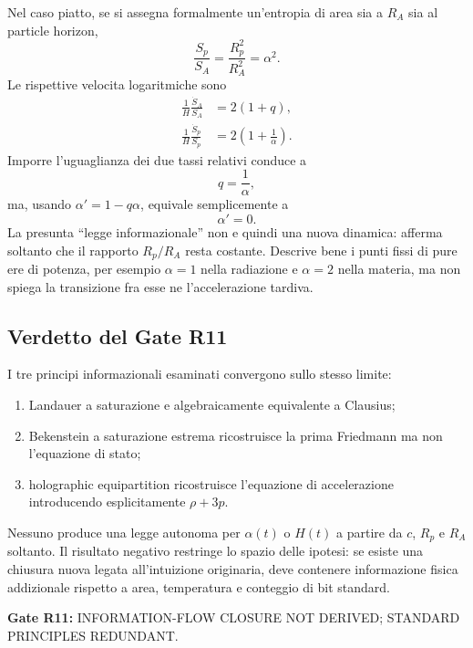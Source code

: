 \documentclass[11pt,a4paper]{article}
\newcommand{\status}[1]{\textsf{#1}}
\begin{document}
Nel caso piatto, se si assegna formalmente un'entropia di area sia a $R_A$ sia al particle horizon,
\begin{equation}
 \frac{S_p}{S_A}=\frac{R_p^2}{R_A^2}=\alpha^2.
\end{equation}
Le rispettive velocita logaritmiche sono
\begin{align}
 \frac{1}{H}\frac{\dot S_A}{S_A}&=2(1+q),\\
 \frac{1}{H}\frac{\dot S_p}{S_p}&=2\left(1+\frac1\alpha\right).
\end{align}
Imporre l'uguaglianza dei due tassi relativi conduce a
\begin{equation}
 q=\frac1\alpha,
\end{equation}
ma, usando $\alpha'=1-q\alpha$, equivale semplicemente a
\begin{equation}
 \boxed{\alpha'=0.}
\end{equation}
La presunta ``legge informazionale'' non e quindi una nuova dinamica: afferma soltanto che il rapporto $R_p/R_A$ resta costante. Descrive bene i punti fissi di pure ere di potenza, per esempio $\alpha=1$ nella radiazione e $\alpha=2$ nella materia, ma non spiega la transizione fra esse ne l'accelerazione tardiva.

\subsection{Verdetto del Gate R11}

I tre principi informazionali esaminati convergono sullo stesso limite:
\begin{enumerate}
\item Landauer a saturazione e algebraicamente equivalente a Clausius;
\item Bekenstein a saturazione estrema ricostruisce la prima Friedmann ma non l'equazione di stato;
\item holographic equipartition ricostruisce l'equazione di accelerazione introducendo esplicitamente $\rho+3p$.
\end{enumerate}
Nessuno produce una legge autonoma per $\alpha(t)$ o $H(t)$ a partire da $c$, $R_p$ e $R_A$ soltanto. Il risultato negativo restringe lo spazio delle ipotesi: se esiste una chiusura nuova legata all'intuizione originaria, deve contenere informazione fisica addizionale rispetto a area, temperatura e conteggio di bit standard.

\textbf{Gate R11:} \status{INFORMATION-FLOW CLOSURE NOT DERIVED; STANDARD PRINCIPLES REDUNDANT}.
\end{document}
